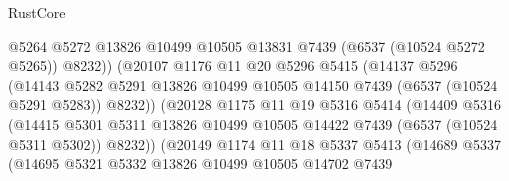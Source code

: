 \begin{lexlean}{RustCore}
\begin{coremodule}
                                  @5264
                                  @5272
                                  @13826
                                  @10499
                                  @10505
                                  @13831
                                  @7439
                                  (@6537 (@10524 @5272 @5265))
                                  @8232))
                              (@20107
                                @1176
                                @11
                                @20
                                @5296
                                @5415
                                (@14137
                                  @5296
                                  (@14143
                                    @5282
                                    @5291
                                    @13826
                                    @10499
                                    @10505
                                    @14150
                                    @7439
                                    (@6537 (@10524 @5291 @5283))
                                    @8232))
                                (@20128
                                  @1175
                                  @11
                                  @19
                                  @5316
                                  @5414
                                  (@14409
                                    @5316
                                    (@14415
                                      @5301
                                      @5311
                                      @13826
                                      @10499
                                      @10505
                                      @14422
                                      @7439
                                      (@6537 (@10524 @5311 @5302))
                                      @8232))
                                  (@20149
                                    @1174
                                    @11
                                    @18
                                    @5337
                                    @5413
                                    (@14689
                                      @5337
                                      (@14695
                                        @5321
                                        @5332
                                        @13826
                                        @10499
                                        @10505
                                        @14702
                                        @7439

\end{coremodule}
\end{lexlean}
